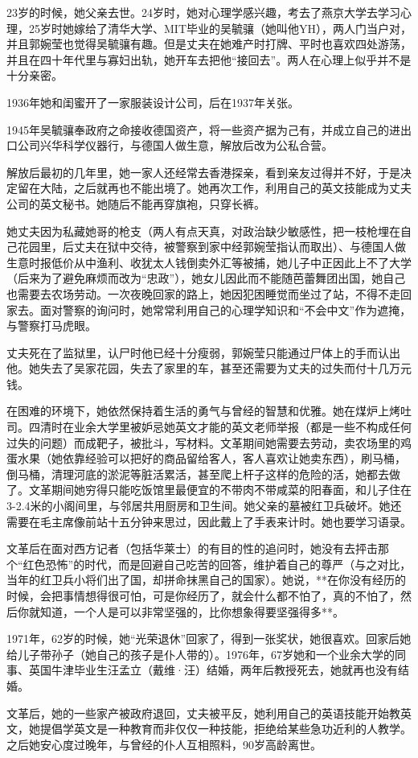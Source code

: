 \begin{itemize*}
    \item 23岁的时候，她父亲去世。24岁时，她对心理学感兴趣，考去了燕京大学去学习心理，25岁时她嫁给了清华大学、MIT毕业的吴毓骧（她叫他YH），两人门当户对，并且郭婉莹也觉得吴毓骧有趣。但是丈夫在她难产时打牌、平时也喜欢四处游荡，并且在四十年代里与寡妇出轨，她开车去把他“接回去”。两人在心理上似乎并不是十分亲密。
    \item 1936年她和闺蜜开了一家服装设计公司，后在1937年关张。
    \item 1945年吴毓骧奉政府之命接收德国资产，将一些资产据为己有，并成立自己的进出口公司兴华科学仪器行，与德国人做生意，解放后改为公私合营。
    \item 解放后最初的几年里，她一家人还经常去香港探亲，看到亲友过得并不好，于是决定留在大陆，之后就再也不能出境了。她再次工作，利用自己的英文技能成为丈夫公司的英文秘书。她随后不能再穿旗袍，只穿长裤。
    \item 她丈夫因为私藏她哥的枪支（两人有点天真，对政治缺少敏感性，把一枝枪埋在自己花园里，后丈夫在狱中交待，被警察到家中经郭婉莹指认而取出）、与德国人做生意时报低价从中渔利、收犹太人钱倒卖外汇等被捕，她儿子中正因此上不了大学（后来为了避免麻烦而改为“忠政”），她女儿因此而不能随芭蕾舞团出国，她自己也需要去农场劳动。一次夜晚回家的路上，她因犯困睡觉而坐过了站，不得不走回家去。面对警察的询问时，她常常利用自己的心理学知识和“不会中文”作为遮掩，与警察打马虎眼。
    \item 丈夫死在了监狱里，认尸时他已经十分瘦弱，郭婉莹只能通过尸体上的手而认出他。她失去了吴家花园，失去了家里的车，甚至还需要为丈夫的过失而付十几万元钱。
    \item 在困难的环境下，她依然保持着生活的勇气与曾经的智慧和优雅。她在煤炉上烤吐司。四清时在业余大学里被妒忌她英文才能的英文老师举报（都是一些不构成任何过失的问题）而成靶子，被批斗，写材料。文革期间她需要去劳动，卖农场里的鸡蛋水果（她依靠经验可以把好的商品留给客人，客人喜欢让她卖东西），刷马桶，倒马桶，清理河底的淤泥等脏活累活，甚至爬上杆子这样的危险的活，她都去做了。文革期间她穷得只能吃饭馆里最便宜的不带肉不带咸菜的阳春面，和儿子住在3-2.4米的小阁间里，与邻居共用厨房和卫生间。她父亲的墓被红卫兵破坏。她还需要在毛主席像前站十五分钟来思过，因此戴上了手表来计时。她也要学习语录。
    \item 文革后在面对西方记者（包括华莱士）的有目的性的追问时，她没有去抨击那个“红色恐怖”的时代，而是回避自己吃苦的回答，维护着自己的尊严（与之对比，当年的红卫兵小将们出了国，却拼命抹黑自己的国家）。她说，**在你没有经历的时候，会把事情想得很可怕，可是你经历了，就会什么都不怕了，真的不怕了，然后你就知道，一个人是可以非常坚强的，比你想象得要坚强得多**。
    \item 1971年，62岁的时候，她“光荣退休”回家了，得到一张奖状，她很喜欢。回家后她给儿子带孙子（她自己的孩子是仆人带的）。1976年，67岁她和一个业余大学的同事、英国牛津毕业生汪孟立（戴维·汪）结婚，两年后教授死去，她就再也没有结婚。
    \item 文革后，她的一些家产被政府退回，丈夫被平反，她利用自己的英语技能开始教英文，她提倡学英文是一种教育而非仅仅一种技能，拒绝给某些急功近利的人教学。之后她安心度过晚年，与曾经的仆人互相照料，90岁高龄离世。
\end{itemize*}

